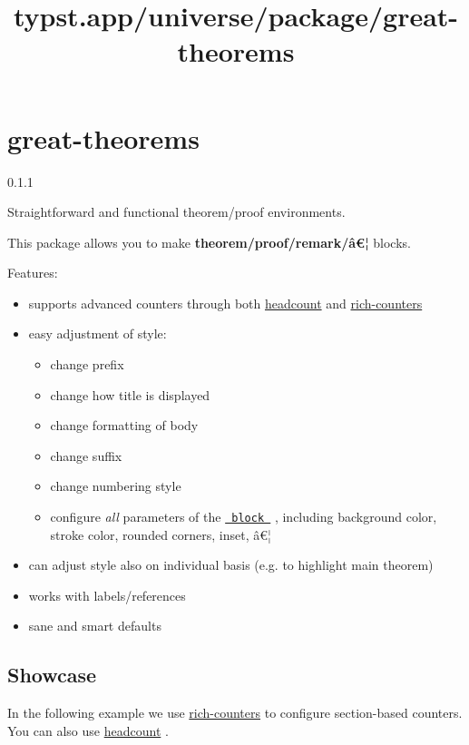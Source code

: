 \title{typst.app/universe/package/great-theorems}

\label{banner}
\section{great-theorems}\label{great-theorems}

{ 0.1.1 }

Straightforward and functional theorem/proof environments.

\label{readme}
This package allows you to make \textbf{theorem/proof/remark/â€¦}
blocks.

Features:

\begin{itemize}
\tightlist
\item
  supports advanced counters through both
  \href{https://typst.app/universe/package/headcount/}{headcount} and
  \href{https://typst.app/universe/package/rich-counters/}{rich-counters}
\item
  easy adjustment of style:

  \begin{itemize}
  \tightlist
  \item
    change prefix
  \item
    change how title is displayed
  \item
    change formatting of body
  \item
    change suffix
  \item
    change numbering style
  \item
    configure \emph{all} parameters of the
    \href{https://typst.app/docs/reference/layout/block/}{\texttt{\ block\ }}
    , including background color, stroke color, rounded corners, inset,
    â€¦
  \end{itemize}
\item
  can adjust style also on individual basis (e.g. to highlight main
  theorem)
\item
  works with labels/references
\item
  sane and smart defaults
\end{itemize}

\subsection{Showcase}\label{showcase}

In the following example we use
\href{https://typst.app/universe/package/rich-counters/}{rich-counters}
to configure section-based counters. You can also use
\href{https://typst.app/universe/package/headcount/}{headcount} .

